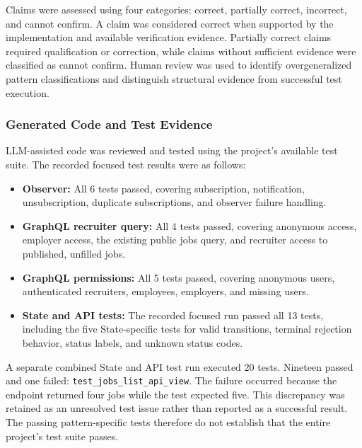 \documentclass[11pt,a4paper]{article}
\begin{document}
Claims were assessed using four categories: correct,
partially correct, incorrect, and cannot confirm. A claim
was considered correct when supported by the implementation
and available verification evidence. Partially correct
claims required qualification or correction, while claims
without sufficient evidence were classified as cannot
confirm. Human review was used to identify overgeneralized
pattern classifications and distinguish structural evidence
from successful test execution.

\subsubsection{Generated Code and Test Evidence}

LLM-assisted code was reviewed and tested using the project's
available test suite. The recorded focused test results were
as follows:

\begin{itemize}
    \item \textbf{Observer:} All 6 tests passed, covering
    subscription, notification, unsubscription, duplicate
    subscriptions, and observer failure handling.

    \item \textbf{GraphQL recruiter query:} All 4 tests passed,
    covering anonymous access, employer access, the existing
    public jobs query, and recruiter access to published,
    unfilled jobs.

    \item \textbf{GraphQL permissions:} All 5 tests passed,
    covering anonymous users, authenticated recruiters,
    employees, employers, and missing users.

    \item \textbf{State and API tests:} The recorded focused
    run passed all 13 tests, including the five State-specific
    tests for valid transitions, terminal rejection behavior,
    status labels, and unknown status codes.
\end{itemize}

A separate combined State and API test run executed 20 tests.
Nineteen passed and one failed:
\texttt{test\_jobs\_list\_api\_view}. The failure occurred
because the endpoint returned four jobs while the test
expected five. This discrepancy was retained as an unresolved
test issue rather than reported as a successful result.
The passing pattern-specific tests therefore do not establish
that the entire project's test suite passes.
\end{document}
